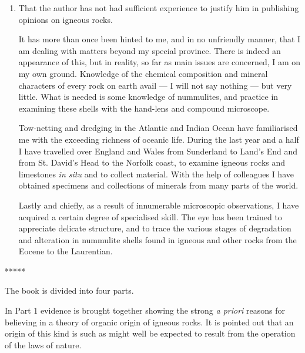 \documentclass[a4paper, 12pt, oneside, landscape]{article}
\begin{document}
\begin{enumerate}
  \item That the author has not had sufficient experience to justify him in publishing opinions on igneous rocks.

\hspace*{5mm}It has more than once been hinted to me, and in no unfriendly manner, that I am dealing with matters beyond my special province. There is indeed an appearance of this, but in reality, so far as main issues are concerned, I am on my own ground. Knowledge of the chemical composition and mineral characters of every rock on earth avail --- I will not say nothing --- but very little. What is needed is some knowledge of nummulites, and practice in examining these shells with the hand-lens and compound microscope.

\hspace*{5mm}Tow-netting and dredging in the Atlantic and Indian Ocean have familiarised me with the exceeding richness of oceanic life. During the last year and a half I have travelled over England and Wales from Sunderland to Land's End and from St. David's Head to the Norfolk coast, to examine igneous rocks and limestones \emph{in situ} and to collect material. With the help of colleagues I have obtained specimens and collections of minerals from many parts of the world.

\hspace*{5mm}Lastly and chiefly, as a result of innumerable microscopic observations, I have acquired a certain degree of specialised skill. The eye has been trained to appreciate delicate structure, and to trace the various stages of degradation and alteration in nummulite shells found in igneous and other rocks from the Eocene to the Laurentian.
\end{enumerate}

\centerline{*\hspace{15mm}*\hspace{15mm}*\hspace{15mm}*\hspace{15mm}*}
\bigskip

The book is divided into four parts.

In Part 1 evidence is brought together showing the strong \emph{a priori} reasons for believing in a theory of organic origin of igneous rocks. It is pointed out that an origin of this kind is such as might well be expected to result from the operation of the laws of nature.
\end{document}
